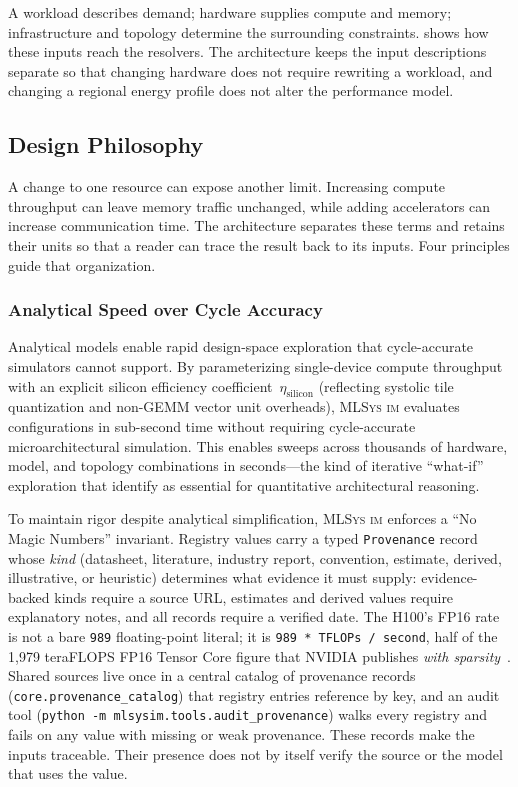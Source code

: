 \documentclass[10pt,twocolumn]{article}
\newcommand{\mlsysim}{\mbox{\textsc{MLSys}\,\textperiodcentered\,\textsc{im}}\xspace}
\begin{document}
A workload describes demand; hardware supplies compute and memory; infrastructure and topology determine the surrounding constraints.  shows how these inputs reach the resolvers. The architecture keeps the input descriptions separate so that changing hardware does not require rewriting a workload, and changing a regional energy profile does not alter the performance model.

\subsection{Design Philosophy}
\label{sec:philosophy}

A change to one resource can expose another limit. Increasing compute throughput can leave memory traffic unchanged, while adding accelerators can increase communication time. The architecture separates these terms and retains their units so that a reader can trace the result back to its inputs. Four principles guide that organization.

\subsubsection{Analytical Speed over Cycle Accuracy}
\label{sec:speed}

Analytical models enable rapid design-space exploration that cycle-accurate simulators cannot support. By parameterizing single-device compute throughput with an explicit silicon efficiency coefficient~$\eta_{\text{silicon}}$ (reflecting systolic tile quantization and non-GEMM vector unit overheads), \mlsysim evaluates configurations in sub-second time without requiring cycle-accurate microarchitectural simulation. This enables sweeps across thousands of hardware, model, and topology combinations in seconds---the kind of iterative ``what-if'' exploration that \citet{hennessy2024architecture} identify as essential for quantitative architectural reasoning.

To maintain rigor despite analytical simplification, \mlsysim enforces a ``No Magic Numbers'' invariant. Registry values carry a typed \texttt{Provenance} record whose \emph{kind} (datasheet, literature, industry report, convention, estimate, derived, illustrative, or heuristic) determines what evidence it must supply: evidence-backed kinds require a source URL, estimates and derived values require explanatory notes, and all records require a verified date. The H100's FP16 rate is not a bare \texttt{989} floating-point literal; it is \texttt{989\,*\,TFLOPs\,/\,second}, half of the 1{,}979 teraFLOPS FP16 Tensor Core figure that NVIDIA publishes \emph{with sparsity}~\citep{nvidia2023h100}. Shared sources live once in a central catalog of \CountProvenanceRecords{} provenance records (\texttt{core.provenance\_catalog}) that registry entries reference by key, and an audit tool (\texttt{python -m mlsysim.tools.audit\_provenance}) walks every registry and fails on any value with missing or weak provenance. These records make the inputs traceable. Their presence does not by itself verify the source or the model that uses the value.
\end{document}
